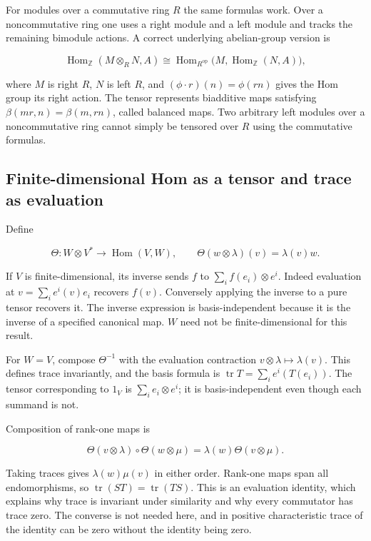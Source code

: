 \documentclass[
  11pt,
]{article}
\begin{document}
For modules over a commutative ring \(R\) the same formulas work. Over a
noncommutative ring one uses a right module and a left module and tracks
the remaining bimodule actions. A correct underlying abelian-group
version is

\[\operatorname{Hom}_{\mathbb Z}(M\otimes_R N,A)
\cong\operatorname{Hom}_{R^{\mathrm{op}}}
\bigl(M,\operatorname{Hom}_{\mathbb Z}(N,A)\bigr),\]

where \(M\) is right \(R\), \(N\) is left \(R\), and
\((\phi\cdot r)(n)=\phi(rn)\) gives the Hom group its right action. The
tensor represents biadditive maps satisfying
\(\beta(mr,n)=\beta(m,rn)\), called balanced maps. Two arbitrary left
modules over a noncommutative ring cannot simply be tensored over \(R\)
using the commutative formulas.

\subsection{Finite-dimensional Hom as a tensor and trace as
evaluation}\label{finite-dimensional-hom-as-a-tensor-and-trace-as-evaluation}

Define

\[\Theta:W\otimes V^*\to\operatorname{Hom}(V,W),\qquad
\Theta(w\otimes\lambda)(v)=\lambda(v)w.\]

If \(V\) is finite-dimensional, its inverse sends \(f\) to
\(\sum_i f(e_i)\otimes e^i\). Indeed evaluation at
\(v=\sum_i e^i(v)e_i\) recovers \(f(v)\). Conversely applying the
inverse to a pure tensor recovers it. The inverse expression is
basis-independent because it is the inverse of a specified canonical
map. \(W\) need not be finite-dimensional for this result.

For \(W=V\), compose \(\Theta^{-1}\) with the evaluation contraction
\(v\otimes\lambda\mapsto\lambda(v)\). This defines trace invariantly,
and the basis formula is \(\operatorname{tr}T=\sum_i e^i(T(e_i))\). The
tensor corresponding to \(1_V\) is \(\sum_i e_i\otimes e^i\); it is
basis-independent even though each summand is not.

Composition of rank-one maps is

\[\Theta(v\otimes\lambda)\circ\Theta(w\otimes\mu)
=\lambda(w)\Theta(v\otimes\mu).\]

Taking traces gives \(\lambda(w)\mu(v)\) in either order. Rank-one maps
span all endomorphisms, so
\(\operatorname{tr}(ST)=\operatorname{tr}(TS)\). This is an evaluation
identity, which explains why trace is invariant under similarity and why
every commutator has trace zero. The converse is not needed here, and in
positive characteristic trace of the identity can be zero without the
identity being zero.
\end{document}
